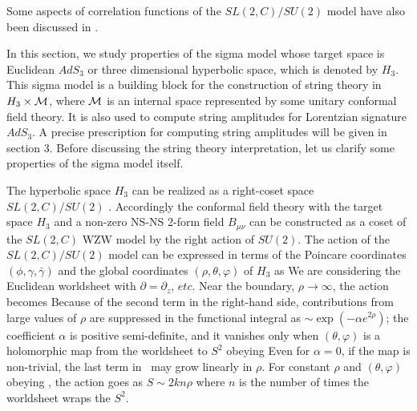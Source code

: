 Some aspects of correlation functions
of the $SL(2,C)/SU(2)$ model have also been discussed in
.





In this section, we study properties of the sigma model whose target
space is Euclidean $AdS_3$ or three dimensional hyperbolic space,
which is denoted by $H_3$. This sigma model is a building block
for the construction of string theory in $H_3 \times {\cal M}$,
where ${\cal M}$ is an internal space represented by some
unitary conformal field theory.
It is also used to compute string amplitudes for
Lorentzian signature $AdS_3$. A precise prescription for
computing string amplitudes will be given in section 3.
Before discussing the string theory interpretation,
let us clarify some properties of the sigma model itself.

The hyperbolic space $H_3$ can be realized as a right-coset space
$SL(2,C)/SU(2)$ \gawedzki . Accordingly the conformal field theory
with the target space $H_3$ and a non-zero NS-NS 2-form
field $B_{\mu\nu}$ can be constructed as a coset of the
$SL(2,C)$ WZW model by the right action of $SU(2)$.
The action of the $SL(2,C)/SU(2)$ model
can be expressed in terms of the Poincare coordinates
$(\phi, \gamma, \bar{\gamma})$
and the global coordinates $(\rho, \theta, \varphi)$ of
$H_3$ as
\eqn{}
We are considering the Euclidean worldsheet with
$\partial = \partial_z$, $etc$.
Near the boundary, $\rho \rightarrow \infty$,
the action becomes
\eqn{}
Because of the second term in the right-hand side,
contributions from large values of $\rho$ are
suppressed in the functional integral as $\sim
\exp(-\alpha e^{2\rho})$; the coefficient
$\alpha$ is positive semi-definite, and
it vanishes only when
$(\theta,\varphi)$ is
a holomorphic map from the worldsheet to $S^2$
obeying
\eqn{}
Even for $\alpha=0$, if the map is non-trivial,
the last term in \largerhoaction\ may grow linearly
in $\rho$. For constant $\rho$ and $(\theta,\varphi)$
obeying \holcondition, the action
goes as $S \sim 2 kn \rho$ where $n$ is the number
of times the worldsheet wraps the $S^2$.

